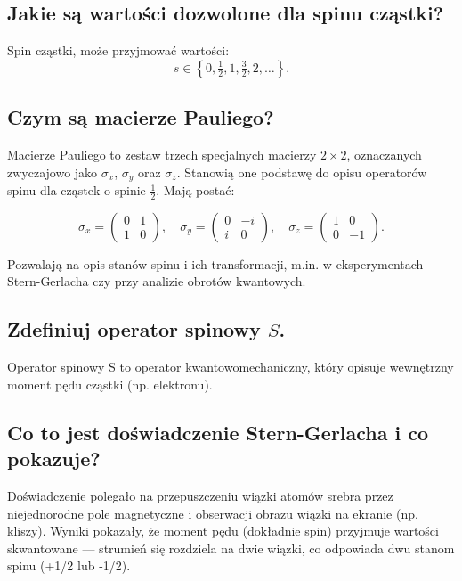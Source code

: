 \subsection{Jakie są wartości dozwolone dla spinu cząstki?}

Spin cząstki, może przyjmować wartości:
\[
s \in \left\{ 0, \tfrac{1}{2}, 1, \tfrac{3}{2}, 2, \dots \right\}.
\]

\subsection{Czym są macierze Pauliego?}

Macierze Pauliego to zestaw trzech specjalnych macierzy \( 2 \times 2 \), oznaczanych zwyczajowo jako \( \sigma_x \), \( \sigma_y \) oraz \( \sigma_z \). Stanowią one podstawę do opisu operatorów spinu dla cząstek o spinie \( \frac{1}{2} \). Mają postać:

\[
\sigma_x = \begin{pmatrix}
0 & 1 \\
1 & 0
\end{pmatrix}, \quad
\sigma_y = \begin{pmatrix}
0 & -i \\
i & 0
\end{pmatrix}, \quad
\sigma_z = \begin{pmatrix}
1 & 0 \\
0 & -1
\end{pmatrix}.
\]

Pozwalają na opis stanów spinu i ich transformacji, m.in. w eksperymentach Stern-Gerlacha czy przy analizie obrotów kwantowych.

\subsection{Zdefiniuj operator spinowy $S$.}

Operator spinowy S to operator kwantowomechaniczny, który opisuje wewnętrzny moment pędu cząstki (np. elektronu).

\subsection{Co to jest doświadczenie Stern-Gerlacha i co pokazuje?}

Doświadczenie polegało na przepuszczeniu wiązki atomów srebra przez niejednorodne pole magnetyczne i obserwacji obrazu wiązki na ekranie (np. kliszy). Wyniki pokazały, że moment pędu (dokładnie spin) przyjmuje wartości skwantowane — strumień się rozdziela na dwie wiązki, co odpowiada dwu stanom spinu (+1/2 lub -1/2).

